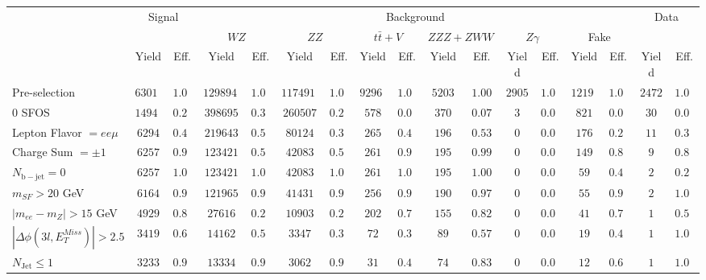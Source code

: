 \begin{tabular}{l||c|c||c|c||c|c||c|c||c|c||c|c||c|c||c|c}
\hline
 &                 \multicolumn{2}{c||}{Signal}            &  \multicolumn{12}{c||}{Background} &  \multicolumn{2}{c}{Data} \\
 & &  & \multicolumn{2}{c||}{$WZ$} & \multicolumn{2}{c||}{$ZZ$} & \multicolumn{2}{c||}{$t\bar{t}+V$} & \multicolumn{2}{c||}{$ZZZ+ZWW$} & \multicolumn{2}{c||}{$Z\gamma$} & \multicolumn{2}{c||}{Fake} &  & \\ 
 & Yield & Eff. & Yield & Eff. & Yield & Eff. & Yield & Eff. & Yield & Eff. & Yield & Eff. & Yield & Eff. & Yield & Eff.\\
\hline\hline
Pre-selection &  $63019$ &  $1.00$ &  $1298941$ &  $1.00$ &  $1174916$ &  $1.00$ &  $92968$ &  $1.00$ &  $5203$ &  $1.00$ &  $2905$ &  $1.00$ &  $12192$ &  $1.00$ &  $2472$ &  $1.00$\\ 
\hline
0 SFOS &  $14943$ &  $0.24$ &  $398695$ &  $0.31$ &  $260507$ &  $0.22$ &  $578$ &  $0.01$ &  $370$ &  $0.07$ &  $3$ &  $0.00$ &  $821$ &  $0.07$ &  $30$ &  $0.01$\\ 
\hline
Lepton Flavor $= ee\mu$ &  $6294$ &  $0.42$ &  $219643$ &  $0.55$ &  $80124$ &  $0.31$ &  $265$ &  $0.46$ &  $196$ &  $0.53$ &  $0$ &  $0.00$ &  $176$ &  $0.21$ &  $11$ &  $0.37$\\ 
\hline
Charge Sum $= \pm 1$ &  $6257$ &  $0.99$ &  $123421$ &  $0.56$ &  $42083$ &  $0.53$ &  $261$ &  $0.98$ &  $195$ &  $0.99$ &  $0$ &  $0.00$ &  $149$ &  $0.85$ &  $9$ &  $0.82$\\ 
\hline
$N_{\mathrm{b-jet}} = 0$ &  $6257$ &  $1.00$ &  $123421$ &  $1.00$ &  $42083$ &  $1.00$ &  $261$ &  $1.00$ &  $195$ &  $1.00$ &  $0$ &  $0.00$ &  $59$ &  $0.40$ &  $2$ &  $0.22$\\ 
\hline
$m_{SF} > 20$ GeV &  $6164$ &  $0.99$ &  $121965$ &  $0.99$ &  $41431$ &  $0.98$ &  $256$ &  $0.98$ &  $190$ &  $0.97$ &  $0$ &  $0.00$ &  $55$ &  $0.93$ &  $2$ &  $1.00$\\ 
\hline
$|m_{ee} - m_{Z}| > 15$ GeV &  $4929$ &  $0.80$ &  $27616$ &  $0.23$ &  $10903$ &  $0.26$ &  $202$ &  $0.79$ &  $155$ &  $0.82$ &  $0$ &  $0.00$ &  $41$ &  $0.75$ &  $1$ &  $0.50$\\ 
\hline
$|\Delta\phi(3l,E_{T}^{Miss})| > 2.5$ &  $3419$ &  $0.69$ &  $14162$ &  $0.51$ &  $3347$ &  $0.31$ &  $72$ &  $0.36$ &  $89$ &  $0.57$ &  $0$ &  $0.00$ &  $19$ &  $0.46$ &  $1$ &  $1.00$\\ 
\hline
$N_{\mathrm{Jet}} \leq 1$ &  $3233$ &  $0.95$ &  $13334$ &  $0.94$ &  $3062$ &  $0.91$ &  $31$ &  $0.43$ &  $74$ &  $0.83$ &  $0$ &  $0.00$ &  $12$ &  $0.63$ &  $1$ &  $1.00$\\ 
\hline
\end{tabular}
